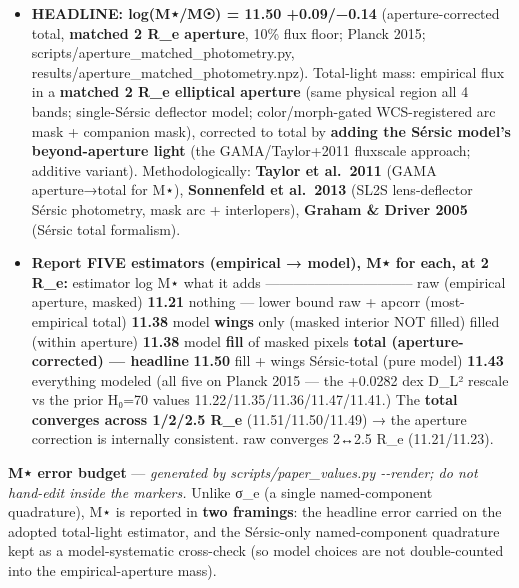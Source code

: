 \documentclass[
]{article}
\providecommand{\tightlist}{%
  \setlength{\itemsep}{0pt}\setlength{\parskip}{0pt}}
\newcommand{\BreakablePath}[1]{{\ttfamily\sloppy #1}}
\begin{document}
\begin{itemize}
\tightlist
\item
  \textbf{HEADLINE: log(M⋆/M☉) = 11.50 +0.09/−0.14} (aperture-corrected
  total, \textbf{matched 2 R\_e aperture}, 10\% flux floor; Planck 2015;
  \BreakablePath{scripts/\discretionary{}{}{}aperture\_\discretionary{}{}{}matched\_\discretionary{}{}{}photometry.\discretionary{}{}{}py},
  \BreakablePath{results/\discretionary{}{}{}aperture\_\discretionary{}{}{}matched\_\discretionary{}{}{}photometry.\discretionary{}{}{}npz}).
  Total-light mass: empirical flux in a \textbf{matched 2 R\_e
  elliptical aperture} (same physical region all 4 bands; single-Sérsic
  deflector model; color/morph-gated WCS-registered arc mask + companion
  mask), corrected to total by \textbf{adding the Sérsic model's
  beyond-aperture light} (the GAMA/Taylor+2011 \BreakablePath{fluxscale}
  approach; additive variant). Methodologically: \textbf{Taylor et
  al.~2011} (GAMA aperture→total for M⋆), \textbf{Sonnenfeld et
  al.~2013} (SL2S lens-deflector Sérsic photometry, mask arc +
  interlopers), \textbf{Graham \& Driver 2005} (Sérsic total formalism).
\item
  \textbf{Report FIVE estimators (empirical → model), M⋆ for each, at 2
  R\_e:} \textbar{} estimator \textbar{} log M⋆ \textbar{} what it adds
  \textbar{}
  \textbar-----------\textbar--------\textbar--------------\textbar{}
  \textbar{} raw (empirical aperture, masked) \textbar{} \textbf{11.21}
  \textbar{} nothing --- lower bound \textbar{} \textbar{} raw + apcorr
  (most-empirical total) \textbar{} \textbf{11.38} \textbar{} model
  \textbf{wings} only (masked interior NOT filled) \textbar{} \textbar{}
  filled (within aperture) \textbar{} \textbf{11.38} \textbar{} model
  \textbf{fill} of masked pixels \textbar{} \textbar{} \textbf{total
  (aperture-corrected) --- headline} \textbar{} \textbf{11.50}
  \textbar{} fill + wings \textbar{} \textbar{} Sérsic-total (pure
  model) \textbar{} \textbf{11.43} \textbar{} everything modeled
  \textbar{} (all five on Planck 2015 --- the +0.0282 dex D\_L² rescale
  vs the prior H₀=70 values 11.22/11.35/11.36/11.47/11.41.) The
  \textbf{total converges across 1/2/2.5 R\_e} (11.51/11.50/11.49) → the
  aperture correction is internally consistent. raw converges 2↔2.5 R\_e
  (11.21/11.23).
\end{itemize}

\textbf{M⋆ error budget} --- \emph{generated by
\BreakablePath{scripts/\discretionary{}{}{}paper\_\discretionary{}{}{}values.\discretionary{}{}{}py -\discretionary{}{}{}-\discretionary{}{}{}render};
do not hand-edit inside the markers.} Unlike σ\_e (a single
named-component quadrature), M⋆ is reported in \textbf{two framings}:
the headline error carried on the adopted total-light estimator, and the
Sérsic-only named-component quadrature kept as a model-systematic
cross-check (so model choices are not double-counted into the
empirical-aperture mass).
\end{document}
